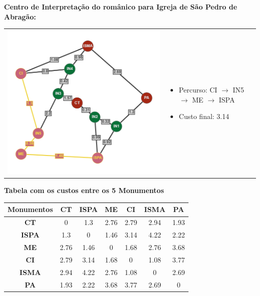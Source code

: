 \documentclass[12pt]{article}
\begin{document}
    \noindent \textbf{Centro de Interpretação do românico para Igreja de São Pedro de Abragão:}\\
    \begin{tabular}{@{}m{}m{}@{}}
      \centering\includegraphics[scale=0.4]{anexos/CI-ISPA.png} &
      \begin{itemize}
        \item Percurso: CI $\rightarrow$ IN5 $\rightarrow$ ME $\rightarrow$ ISPA
        \item Custo final: 3.14
      \end{itemize}
    \end{tabular} 
    
    \begin{center}
        \textbf{Tabela com os custos entre os 5 Monumentos}
    \end{center}
    
    \begin{table}[hbt!]
            \centering
            \begin{tabular}{*{7}{|c}|}
            \hline
            \textbf{Monumentos} & \textbf{CT} & \textbf{ISPA} & \textbf{ME} & \textbf{CI} & \textbf{ISMA} & \textbf{PA}\\ \hline
            \textbf{CT} & 0 & 1.3 & 2.76 & 2.79 & 2.94 & 1.93 \\ \hline
            \textbf{ISPA} & 1.3 & 0 & 1.46 & 3.14 & 4.22 & 2.22 \\ \hline
            \textbf{ME} & 2.76 & 1.46 & 0 & 1.68 & 2.76 & 3.68 \\ \hline
            \textbf{CI} & 2.79 & 3.14 & 1.68 & 0 & 1.08 & 3.77 \\ \hline
            \textbf{ISMA} & 2.94 & 4.22 & 2.76 & 1.08 & 0 & 2.69 \\ \hline
            \textbf{PA} & 1.93 & 2.22 & 3.68 & 3.77 & 2.69 & 0 \\ \hline
        
            \end{tabular}
        \end{table}
    \newpage
\end{document}
